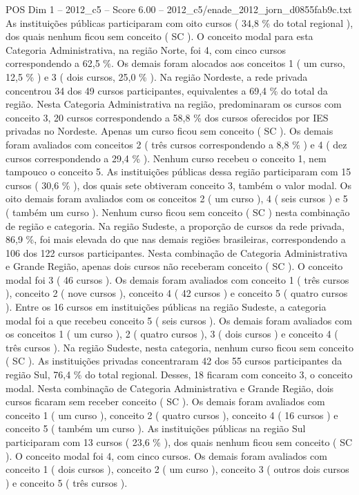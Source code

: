 \begin{textsample}{POS Dim 1 – 2012\_c5 – Score 6.00 – 2012\_c5/enade\_2012\_jorn\_d0855fab9c.txt}
As instituições públicas participaram com oito cursos ( 34,8 \% do total regional ), dos quais nenhum ficou sem conceito ( SC ).
O conceito modal para esta Categoria Administrativa, na região Norte, foi 4, com cinco cursos correspondendo a 62,5 \%.
Os demais foram alocados aos conceitos 1 ( um curso, 12,5 \% ) e 3 ( dois cursos, 25,0 \% ).
Na região Nordeste, a rede privada concentrou 34 dos 49 cursos participantes, equivalentes a 69,4 \% do total da região.
Nesta Categoria Administrativa na região, predominaram os cursos com conceito 3, 20 cursos correspondendo a 58,8 \% dos cursos oferecidos por IES privadas no Nordeste.
Apenas um curso ficou sem conceito ( SC ).
Os demais foram avaliados com conceitos 2 ( três cursos correspondendo a 8,8 \% ) e 4 ( dez cursos correspondendo a 29,4 \% ).
Nenhum curso recebeu o conceito 1, nem tampouco o conceito 5.
As instituições públicas dessa região participaram com 15 cursos ( 30,6 \% ), dos quais sete obtiveram conceito 3, também o valor modal.
Os oito demais foram avaliados com os conceitos 2 ( um curso ), 4 ( seis cursos ) e 5 ( também um curso ).
Nenhum curso ficou sem conceito ( SC ) nesta combinação de região e categoria.
Na região Sudeste, a proporção de cursos da rede privada, 86,9 \%, foi mais elevada do que nas demais regiões brasileiras, correspondendo a 106 dos 122 cursos participantes.
Nesta combinação de Categoria Administrativa e Grande Região, apenas dois cursos não receberam conceito ( SC ).
O conceito modal foi 3 ( 46 cursos ).
Os demais foram avaliados com conceito 1 ( três cursos ), conceito 2 ( nove cursos ), conceito 4 ( 42 cursos ) e conceito 5 ( quatro cursos ).
Entre os 16 cursos em instituições públicas na região Sudeste, a categoria modal foi a que recebeu conceito 5 ( seis cursos ).
Os demais foram avaliados com os conceitos 1 ( um curso ), 2 ( quatro cursos ), 3 ( dois cursos ) e conceito 4 ( três cursos ).
Na região Sudeste, nesta categoria, nenhum curso ficou sem conceito ( SC ).
As instituições privadas concentraram 42 dos 55 cursos participantes da região Sul, 76,4 \% do total regional.
Desses, 18 ficaram com conceito 3, o conceito modal.
Nesta combinação de Categoria Administrativa e Grande Região, dois cursos ficaram sem receber conceito ( SC ).
Os demais foram avaliados com conceito 1 ( um curso ), conceito 2 ( quatro cursos ), conceito 4 ( 16 cursos ) e conceito 5 ( também um curso ).
As instituições públicas na região Sul participaram com 13 cursos ( 23,6 \% ), dos quais nenhum ficou sem conceito ( SC ).
O conceito modal foi 4, com cinco cursos.
Os demais foram avaliados com conceito 1 ( dois cursos ), conceito 2 ( um curso ), conceito 3 ( outros dois cursos ) e conceito 5 ( três cursos ).

\end{textsample}
